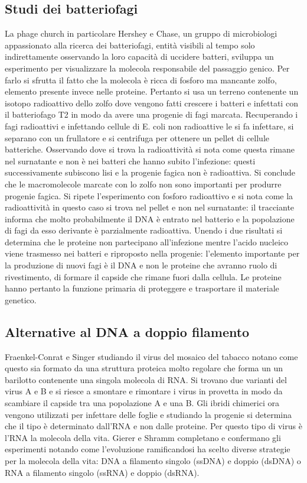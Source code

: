 \subsection{Studi dei batteriofagi}
La phage church in particolare Hershey e Chase, un gruppo di microbiologi appassionato alla ricerca dei batteriofagi, entit\`a visibili al tempo solo indirettamente osservando la loro 
capacit\`a di uccidere batteri, sviluppa un esperimento per visualizzare la molecola responsabile del passaggio genico. Per farlo si sfrutta il fatto che la molecola \`e ricca di 
fosforo ma mancante zolfo, elemento presente invece nelle proteine. Pertanto si usa un terreno contenente un isotopo radioattivo dello zolfo dove vengono fatti crescere i batteri e 
infettati con il batteriofago T2 in modo da avere una progenie di fagi marcata. Recuperando i fagi radioattivi e infettando cellule di E. coli non radioattive le si fa infettare, si 
separano con un frullatore e si centrifuga per ottenere un pellet di cellule batteriche. Osservando dove si trova la radioattivit\`a si nota come questa rimane nel surnatante e non \`e 
nei batteri che hanno subito l'infezione: questi successivamente subiscono lisi e la progenie fagica non \`e radioattiva. Si conclude che le macromolecole marcate con lo zolfo non sono 
importanti per produrre progenie fagica. Si ripete l'esperimento con fosforo radioattivo e si nota come la radioattivit\`a in questo caso si trova nel pellet e non nel surnatante: il 
tracciante informa che molto probabilmente il DNA \`e entrato nel batterio e la popolazione di fagi da esso derivante \`e parzialmente radioattiva. Unendo i due risultati si determina 
che le proteine non partecipano all'infezione mentre l'acido nucleico viene trasmesso nei batteri e riproposto nella progenie: l'elemento importante per la produzione di nuovi fagi \`e 
il DNA e non le proteine che avranno ruolo di rivestimento, di formare il capside che rimane fuori dalla cellula. Le proteine hanno pertanto la funzione primaria di proteggere e 
trasportare il materiale genetico. 
\subsection{Alternative al DNA a doppio filamento}
Fraenkel-Conrat e Singer studiando il virus del mosaico del tabacco notano come questo sia formato da una struttura proteica molto regolare che forma un un barilotto contenente una 
singola molecola di RNA. Si trovano due varianti del virus A e B e si riesce a smontare e rimontare i virus in provetta in modo da scambiare il capside tra una popolazione A e una B. 
Gli ibridi chimerici ora vengono utilizzati per infettare delle foglie e studiando la progenie si determina che il tipo \`e determinato dall'RNA e non dalle proteine. Per questo tipo 
di virus \`e l'RNA la molecola della vita. Gierer e Shramm completano e confermano gli esperimenti notando come l'evoluzione ramificandosi ha scelto diverse strategie per la molecola
della vita: DNA a filamento singolo (ssDNA) e doppio (dsDNA) o RNA a filamento singolo (ssRNA) e doppio (dsRNA). 
